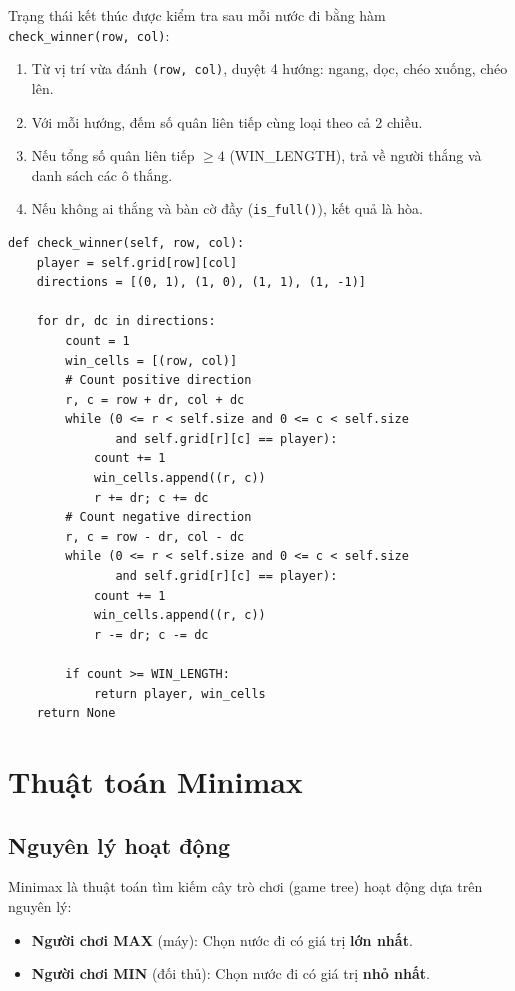 \documentclass[12pt,a4paper]{article}
\begin{document}
Trạng thái kết thúc được kiểm tra sau mỗi nước đi bằng hàm \texttt{check\_winner(row, col)}:

\begin{enumerate}
    \item Từ vị trí vừa đánh \texttt{(row, col)}, duyệt 4 hướng: ngang, dọc, chéo xuống, chéo lên.
    \item Với mỗi hướng, đếm số quân liên tiếp cùng loại theo cả 2 chiều.
    \item Nếu tổng số quân liên tiếp $\geq 4$ (WIN\_LENGTH), trả về người thắng và danh sách các ô thắng.
    \item Nếu không ai thắng và bàn cờ đầy (\texttt{is\_full()}), kết quả là hòa.
\end{enumerate}

\begin{lstlisting}[style=python]
def check_winner(self, row, col):
    player = self.grid[row][col]
    directions = [(0, 1), (1, 0), (1, 1), (1, -1)]
    
    for dr, dc in directions:
        count = 1
        win_cells = [(row, col)]
        # Count positive direction
        r, c = row + dr, col + dc
        while (0 <= r < self.size and 0 <= c < self.size 
               and self.grid[r][c] == player):
            count += 1
            win_cells.append((r, c))
            r += dr; c += dc
        # Count negative direction
        r, c = row - dr, col - dc
        while (0 <= r < self.size and 0 <= c < self.size 
               and self.grid[r][c] == player):
            count += 1
            win_cells.append((r, c))
            r -= dr; c -= dc
        
        if count >= WIN_LENGTH:
            return player, win_cells
    return None
\end{lstlisting}

\section{Thuật toán Minimax}

\subsection{Nguyên lý hoạt động}

Minimax là thuật toán tìm kiếm cây trò chơi (game tree) hoạt động dựa trên nguyên lý:

\begin{itemize}
    \item \textbf{Người chơi MAX} (máy): Chọn nước đi có giá trị \textbf{lớn nhất}.
    \item \textbf{Người chơi MIN} (đối thủ): Chọn nước đi có giá trị \textbf{nhỏ nhất}.
\end{itemize}
\end{document}
